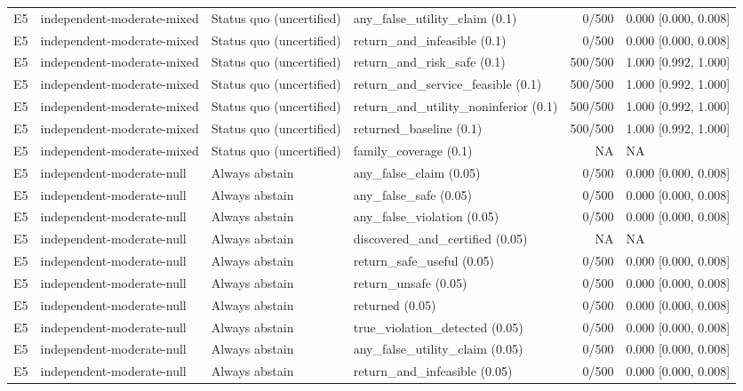 \begin{longtable}{p{.04\linewidth}p{.18\linewidth}p{.19\linewidth}p{.16\linewidth}r p{.21\linewidth}}
E5 & independent-moderate-mixed & Status quo (uncertified) & any\_false\_utility\_claim (0.1) & 0/500 & 0.000 [0.000, 0.008]\\
E5 & independent-moderate-mixed & Status quo (uncertified) & return\_and\_infeasible (0.1) & 0/500 & 0.000 [0.000, 0.008]\\
E5 & independent-moderate-mixed & Status quo (uncertified) & return\_and\_risk\_safe (0.1) & 500/500 & 1.000 [0.992, 1.000]\\
E5 & independent-moderate-mixed & Status quo (uncertified) & return\_and\_service\_feasible (0.1) & 500/500 & 1.000 [0.992, 1.000]\\
E5 & independent-moderate-mixed & Status quo (uncertified) & return\_and\_utility\_noninferior (0.1) & 500/500 & 1.000 [0.992, 1.000]\\
E5 & independent-moderate-mixed & Status quo (uncertified) & returned\_baseline (0.1) & 500/500 & 1.000 [0.992, 1.000]\\
E5 & independent-moderate-mixed & Status quo (uncertified) & family\_coverage (0.1) & NA & NA\\
E5 & independent-moderate-null & Always abstain & any\_false\_claim (0.05) & 0/500 & 0.000 [0.000, 0.008]\\
E5 & independent-moderate-null & Always abstain & any\_false\_safe (0.05) & 0/500 & 0.000 [0.000, 0.008]\\
E5 & independent-moderate-null & Always abstain & any\_false\_violation (0.05) & 0/500 & 0.000 [0.000, 0.008]\\
E5 & independent-moderate-null & Always abstain & discovered\_and\_certified (0.05) & NA & NA\\
E5 & independent-moderate-null & Always abstain & return\_safe\_useful (0.05) & 0/500 & 0.000 [0.000, 0.008]\\
E5 & independent-moderate-null & Always abstain & return\_unsafe (0.05) & 0/500 & 0.000 [0.000, 0.008]\\
E5 & independent-moderate-null & Always abstain & returned (0.05) & 0/500 & 0.000 [0.000, 0.008]\\
E5 & independent-moderate-null & Always abstain & true\_violation\_detected (0.05) & 0/500 & 0.000 [0.000, 0.008]\\
E5 & independent-moderate-null & Always abstain & any\_false\_utility\_claim (0.05) & 0/500 & 0.000 [0.000, 0.008]\\
E5 & independent-moderate-null & Always abstain & return\_and\_infeasible (0.05) & 0/500 & 0.000 [0.000, 0.008]\\

\end{longtable}

